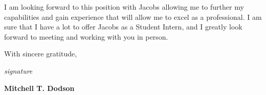 \documentclass[12pt]{article}
\begin{document}
I am looking forward to this position with Jacobs allowing me to further my capabilities and gain experience that will allow me to excel as a professional. I am sure that I have a lot to offer Jacobs as a Student Intern, and I greatly look forward to meeting and working with you in person.

\vspace{1em}

\noindent
With sincere gratitude,

\vspace{1.5em}

\noindent
\textit{ signature }

\vspace{1.5em}

\noindent
\textbf{Mitchell T. Dodson}

\printbibliography
\end{document}
